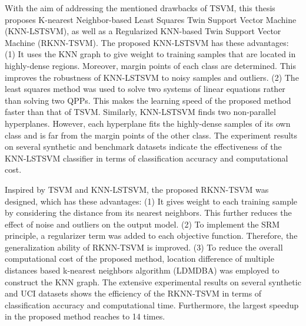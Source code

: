 \documentclass[a4paper, 12pt]{article}
\begin{document}
With the aim of addressing the mentioned drawbacks of TSVM, this thesis proposes K-nearest Neighbor-based Least Squares Twin Support Vector Machine (KNN-LSTSVM), as well as a Regularized KNN-based Twin Support Vector Machine (RKNN-TSVM). The proposed KNN-LSTSVM has these advantages: (1) It uses the KNN graph to give weight to training samples that are located in highly-dense regions. Moreover, margin points of each class are determined. This improves the robustness of KNN-LSTSVM to noisy samples and outliers. (2) The least squares method was used to solve two systems of linear equations rather than solving two QPPs. This makes the learning speed of the proposed method faster than that of TSVM. Similarly, KNN-LSTSVM finds two non-parallel hyperplanes. However, each hyperplane fits the highly-dense samples of its own class and is far from the margin points of the other class. The experiment results on several synthetic and benchmark datasets indicate the effectiveness of the KNN-LSTSVM classifier in terms of classification accuracy and computational cost.

Inspired by TSVM and KNN-LSTSVM, the proposed RKNN-TSVM was designed, which has these advantages: (1) It gives weight to each training sample by considering the distance from its nearest neighbors. This further reduces the effect of noise and outliers on the output model. (2) To implement the SRM principle, a regularizer term was added to each objective function. Therefore, the generalization ability of RKNN-TSVM is improved. (3) To reduce the overall computational cost of the proposed method, location difference of multiple distances based k-nearest neighbors algorithm (LDMDBA) was employed to construct the KNN graph. The extensive experimental results on several synthetic and UCI datasets shows the efficiency of the RKNN-TSVM in terms of classification accuracy and computational time. Furthermore, the largest speedup in the proposed method reaches to 14 times.
\end{document}
